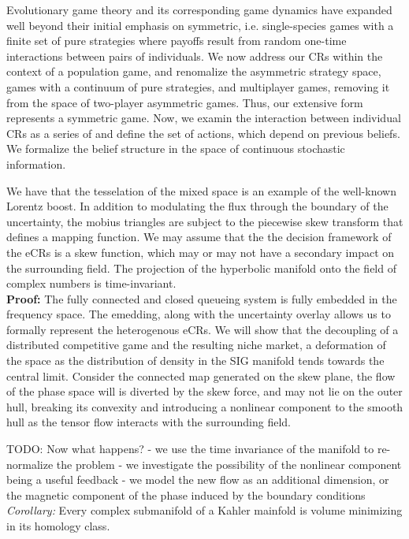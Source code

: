 \documentclass[10pt]{article}
\theoremstyle{definition}
\begin{document}
Evolutionary game theory and its corresponding game dynamics have expanded well
beyond their initial emphasis on symmetric, i.e. single-species  games with a
finite set of pure strategies where payoffs result from random one-time
interactions between pairs of individuals. We now address our CRs within the
context of a population game, and renomalize the asymmetric strategy space,
games with a continuum of pure strategies, and multiplayer games, removing it
from the space of two-player asymmetric games. Thus, our extensive form
represents a symmetric game. Now, we examin the interaction between individual CRs as a
series of and define the set of actions, which depend on previous beliefs. We
formalize the belief structure in the space of continuous stochastic information.

We have that the tesselation of the mixed space is an example of the well-known Lorentz
boost. In addition to modulating the flux through the boundary of the uncertainty,
the mobius triangles are subject to the piecewise skew transform that
defines a mapping function. We may assume that the the decision framework of
the eCRs is a skew function, which may or may not have a secondary impact on
the surrounding field. 
{
    The projection of the hyperbolic manifold
    onto the field of complex numbers is time-invariant. \\
}
\textbf{Proof:}
The fully connected and closed queueing system is fully
embedded in the frequency space. The emedding, along with the uncertainty
overlay allows us to formally represent the heterogenous eCRs. 
We will show that the decoupling of a distributed competitive game 
and the resulting niche market, a deformation of the space as the distribution
of density in the SIG manifold tends towards the central limit. Consider the
connected map generated on the skew plane, the flow of the phase space will
is diverted by the skew force, and may not lie on the outer hull, breaking
its convexity and introducing a nonlinear component to the smooth hull as
the tensor flow interacts with the surrounding field.

TODO: Now what happens?
- we use the time invariance of the manifold to re-normalize the problem
- we investigate the possibility of the nonlinear component being a useful
feedback
- we model the new flow as an additional dimension, or the magnetic
component of the phase induced by the boundary conditions
\emph{Corollary:}
Every complex submanifold of a Kahler mainfold is volume minimizing in its
homology class.
\end{document}
